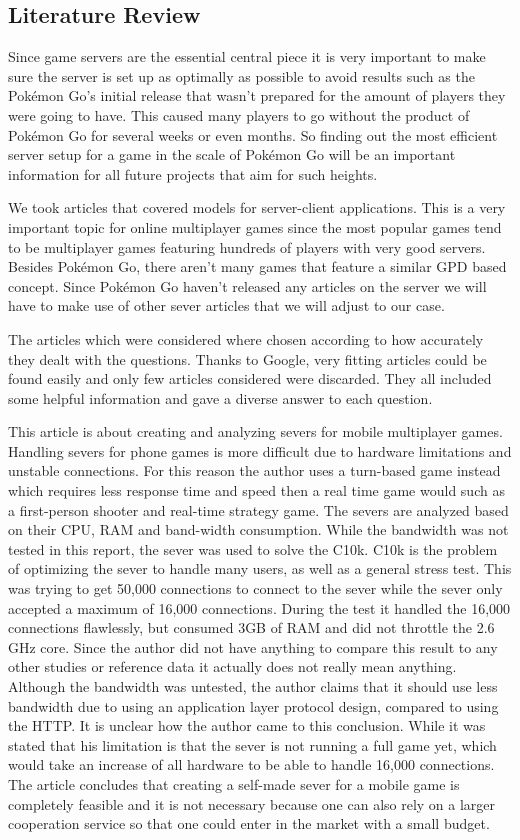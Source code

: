 \documentclass[12pt,a4paper,twoside]{report}
\begin{document}
\subsection{Literature Review}
Since game servers are the essential central piece it is very important to make sure the server is set up as optimally as possible to avoid results such as the Pokémon Go’s initial release that wasn't prepared for the amount of players they were going to have\cite{13}. This caused many players to go without the product of Pokémon Go for several weeks or even months. So finding out the most efficient server setup for a game in the scale of Pokémon Go will be an important information for all future projects that aim for such heights.

We took articles that covered models for server-client applications\cite{12}. This is a very important topic for online multiplayer games since the most popular games tend to be multiplayer games featuring hundreds of players with very good servers. Besides Pokémon Go, there aren't many games that feature a similar GPD based concept. Since Pokémon Go haven’t released any articles on the server we will have to make use of other sever articles that we will adjust to our case.

The articles which were considered where chosen according to how accurately they dealt with the questions. Thanks to Google, very fitting articles could be found easily and only few articles considered were discarded. They all included some helpful information and gave a diverse answer to each question.

This article is about creating and analyzing severs for mobile multiplayer games\cite{14}. Handling severs for phone games is more difficult due to hardware limitations and unstable connections. For this reason the author uses a turn-based game instead which requires less response time and speed then a real time game would such as a first-person shooter and real-time strategy game. The severs are analyzed based on their CPU, RAM and band-width consumption. While the bandwidth was not tested in this report, the sever was used to solve the C10k. C10k is the problem of optimizing the sever to handle many users, as well as a general stress test. This was trying to get 50,000 connections to connect to the sever while the sever only accepted a maximum of 16,000 connections. During the test it handled the 16,000 connections flawlessly, but consumed 3GB of RAM and did not throttle the 2.6 GHz core. Since the author did not have anything to compare this result to any other studies or reference data it actually does not really mean anything. Although the bandwidth was untested, the author claims that it should use less bandwidth due to using an application layer protocol design, compared to using the HTTP. It is unclear how the author came to this conclusion. While it was stated that his limitation is that the sever is not running a full game yet, which would take an increase of all hardware to be able to handle 16,000 connections. The article concludes that creating a self-made sever for a mobile game is completely feasible and it is not necessary because one can also rely on a larger cooperation service so that one could enter in the market with a small budget.
\end{document}
